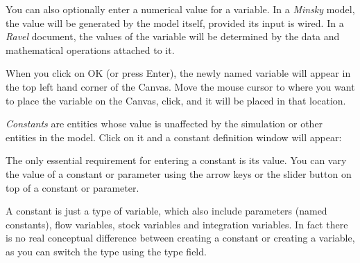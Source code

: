 \begin{description}
You can also optionally enter a numerical value for a variable. In
a \emph{Minsky} model, the value will be generated by the model itself,
provided its input is wired. In a \emph{Ravel} document, the values
of the variable will be determined by the data and mathematical operations
attached to it.

When you click on OK (or press Enter), the newly named variable will
appear in the top left hand corner of the Canvas. Move the mouse cursor
to where you want to place the variable on the Canvas, click, and
it will be placed in that location.

\emph{Constants} are entities whose value is unaffected by the simulation
or other entities in the model. Click on it and a constant definition
window will appear:
\begin{center}
\par\end{center}

The only essential requirement for entering a constant is its value.
You can vary the value of a constant or parameter using the arrow
keys or the slider button on top of a constant or parameter.

A constant is just a type of variable, which also include parameters
(named constants), flow variables, stock variables and integration
variables. In fact there is no real conceptual difference between
creating a constant or creating a variable, as you can switch the
type using the type field.


\end{description}
